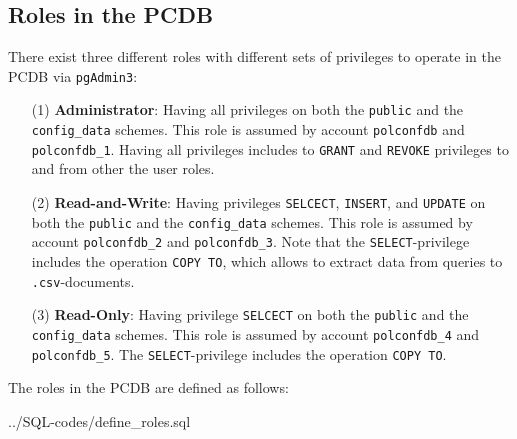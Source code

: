 \subsection{Roles in the PCDB}\label{subsec_access_roles}
There exist three different roles with different sets of privileges to operate in the PCDB via \texttt{\footnotesize pgAdmin3}:
\begin{itemize}
\item[(1)]{{\bf Administrator}: Having all privileges on both the \texttt{\footnotesize public} and the \texttt{\footnotesize config\_data} schemes. 
This role is assumed by account \texttt{\footnotesize polconfdb} and \texttt{\footnotesize polconfdb\_1}. 
Having all privileges includes to \texttt{\footnotesize GRANT} and \texttt{\footnotesize REVOKE} privileges to and from other the user roles.}

\item[(2)]{{\bf Read-and-Write}: Having privileges  \texttt{\footnotesize SELCECT},  \texttt{\footnotesize INSERT}, and  \texttt{\footnotesize UPDATE} on both the \texttt{\footnotesize public} and the \texttt{\footnotesize config\_data} schemes. 
This role is assumed by account \texttt{\footnotesize polconfdb\_2} and \texttt{\footnotesize polconfdb\_3}.
Note that the  \texttt{\footnotesize SELECT}-privilege includes the operation  \texttt{\footnotesize COPY TO}, which allows to extract data from queries to  \texttt{\footnotesize .csv}-documents.}

\item[(3)]{{\bf Read-Only}: Having privilege \texttt{\footnotesize SELCECT} on both the \texttt{\footnotesize public} and the \texttt{\footnotesize config\_data} schemes. 
This role is assumed by account \texttt{\footnotesize polconfdb\_4} and \texttt{\footnotesize polconfdb\_5}.
The \texttt{\footnotesize SELECT}-privilege includes the operation  \texttt{\footnotesize COPY TO}.}
\end{itemize}

The roles in the PCDB are defined as follows:

%
{../SQL-codes/define_roles.sql}